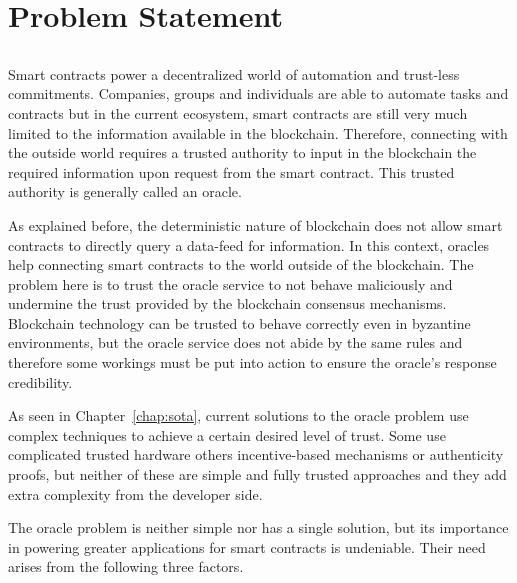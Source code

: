 \chapter{Problem Statement}\label{chap:chap4}

\section*{}


Smart contracts power a decentralized world of automation and trust-less commitments. Companies, groups and individuals are able to automate tasks and contracts but in the current ecosystem, smart contracts are still very much limited to the information available in the blockchain. Therefore, connecting with the outside world requires a trusted authority to input in the blockchain the required information upon request from the smart contract. This trusted authority is generally called an oracle.

As explained before, the deterministic nature of blockchain does not allow smart contracts to directly query a data-feed for information. In this context, oracles help connecting smart contracts to the world outside of the blockchain. The problem here is to trust the oracle service to not behave maliciously and undermine the trust provided by the blockchain consensus mechanisms. Blockchain technology can be trusted to behave correctly even in byzantine environments, but the oracle service does not abide by the same rules and therefore some workings must be put into action to ensure the oracle's response credibility.

As seen in Chapter~\ref{chap:sota}, current solutions to the oracle problem use complex techniques to achieve a certain desired level of trust. Some use complicated trusted hardware others incentive-based mechanisms or authenticity proofs, but neither of these are simple and fully trusted approaches and they add extra complexity from the developer side.

The oracle problem is neither simple nor has a single solution, but its importance in powering greater applications for smart contracts  is undeniable. Their need arises from the following three factors.

